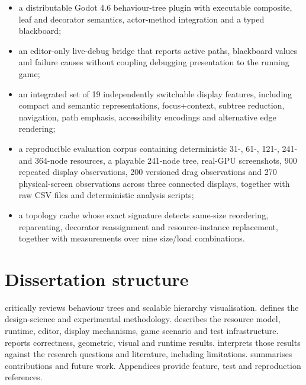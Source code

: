 \begin{itemize}
    \item a distributable Godot 4.6 behaviour-tree plugin with executable composite, leaf and decorator semantics, actor-method integration and a typed blackboard;
    \item an editor-only live-debug bridge that reports active paths, blackboard values and failure causes without coupling debugging presentation to the running game;
    \item an integrated set of 19 independently switchable display features, including compact and semantic representations, focus+context, subtree reduction, navigation, path emphasis, accessibility encodings and alternative edge rendering;
    \item a reproducible evaluation corpus containing deterministic 31-, 61-, 121-, 241- and 364-node resources, a playable 241-node tree, real-\ac{GPU} screenshots, 900 repeated display observations, 200 versioned drag observations and 270 physical-screen observations across three connected displays, together with raw CSV files and deterministic analysis scripts;
    \item a topology cache whose exact signature detects same-size reordering, reparenting, decorator reassignment and resource-instance replacement, together with measurements over nine size/load combinations.
\end{itemize}

\section{Dissertation structure}

 critically reviews behaviour trees and scalable hierarchy visualisation.  defines the design-science and experimental methodology.  describes the resource model, runtime, editor, display mechanisms, game scenario and test infrastructure.  reports correctness, geometric, visual and runtime results.  interprets those results against the research questions and literature, including limitations.  summarises contributions and future work. Appendices provide feature, test and reproduction references.
